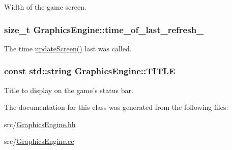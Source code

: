 Width of the game screen. 

\hypertarget{classGraphicsEngine_a03732739efdf1f24a3bda1a202b6b866}{
\subsubsection[{time\-\_\-of\-\_\-last\-\_\-refresh\-\_\-}]{\setlength{\rightskip}{0pt plus 5cm}size\-\_\-t Graphics\-Engine\-::time\-\_\-of\-\_\-last\-\_\-refresh\-\_\-\hspace{0.3cm}{\ttfamily [private]}}}\label{classGraphicsEngine_a03732739efdf1f24a3bda1a202b6b866}


The time \hyperlink{classGraphicsEngine_aeadd04c5518ef05b039241cbb7d09b59}{update\-Screen()} last was called. 

\hypertarget{classGraphicsEngine_afc40023b292929b8b8e53c58b7e8f574}{
\subsubsection[{T\-I\-T\-L\-E}]{\setlength{\rightskip}{0pt plus 5cm}const std\-::string Graphics\-Engine\-::\-T\-I\-T\-L\-E\hspace{0.3cm}{\ttfamily [private]}}}\label{classGraphicsEngine_afc40023b292929b8b8e53c58b7e8f574}


Title to display on the game's status bar. 



The documentation for this class was generated from the following files\-:\begin{DoxyCompactItemize}
\item 
src/\hyperlink{GraphicsEngine_8hh}{Graphics\-Engine.\-hh}\item 
src/\hyperlink{GraphicsEngine_8cc}{Graphics\-Engine.\-cc}\end{DoxyCompactItemize}
